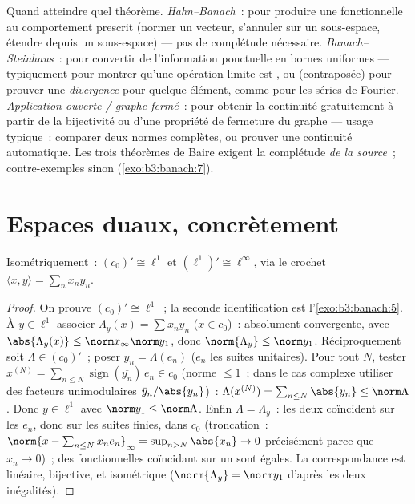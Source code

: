 \begin{method}\label{met:b3:banach:trilogy}
Quand atteindre quel théorème. \emph{Hahn--Banach}~: pour
produire une fonctionnelle au comportement prescrit (normer un
vecteur, s'annuler sur un sous-espace, étendre depuis un
sous-espace) --- pas de complétude nécessaire.
\emph{Banach--Steinhaus}~: pour convertir de l'information
ponctuelle en bornes uniformes --- typiquement pour montrer
qu'une opération limite est , ou (contraposée) pour
prouver une \emph{divergence} pour quelque élément, comme pour
les séries de Fourier. \emph{Application ouverte / graphe
fermé}~: pour obtenir la continuité gratuitement à partir de
la bijectivité  ou d'une propriété de fermeture du
graphe --- usage typique~: comparer deux normes complètes, ou
prouver une continuité automatique. Les trois théorèmes de
Baire exigent la complétude \emph{de la source}~;
contre-exemples sinon (\cref{exo:b3:banach:7}).
\end{method}

\section{Espaces duaux, concrètement}

\begin{theorem}\label{thm:b3:banach:duals}
Isométriquement~: $(c_0)' \cong \ell^1$ et $(\ell^1)' \cong
\ell^\infty$, via le crochet $\langle x, y\rangle = \sum_n
x_ny_n$.
\end{theorem}

\begin{proof}
On prouve $(c_0)' \cong \ell^1$~; la seconde identification
est l'\cref{exo:b3:banach:5}. À $y \in \ell^1$ associer
$\Lambda_y(x) = \sum x_ny_n$ ($x \in c_0$)~: absolument
convergente, avec $\abs{\Lambda_y(x)} \leq \norm
x_\infty\norm y_1$, donc $\norm{\Lambda_y} \leq \norm y_1$.
Réciproquement soit $\Lambda \in (c_0)'$~; poser $y_n =
\Lambda(e_n)$ ($e_n$ les suites unitaires). Pour tout $N$,
tester $x^{(N)} = \sum_{n \leq N}
\operatorname{sign}(\overline{y_n})\,e_n \in c_0$ (norme
$\leq 1$~; dans le cas complexe utiliser des facteurs
unimodulaires $\bar y_n/\abs{y_n}$)~: $\Lambda(x^{(N)}) =
\sum_{n\leq N}\abs{y_n} \leq \norm\Lambda$. Donc $y \in
\ell^1$ avec $\norm y_1 \leq \norm\Lambda$. Enfin $\Lambda =
\Lambda_y$~: les deux coïncident sur les $e_n$, donc sur les
suites finies,  dans $c_0$ (troncation~: $\norm{x -
\sum_{n \leq N}x_ne_n}_\infty = \sup_{n > N}\abs{x_n} \to 0$
précisément parce que $x_n \to 0$)~; des fonctionnelles
 coïncidant sur un  sont égales. La
correspondance est linéaire, bijective, et isométrique
($\norm{\Lambda_y} = \norm y_1$ d'après les deux inégalités).
\end{proof}


